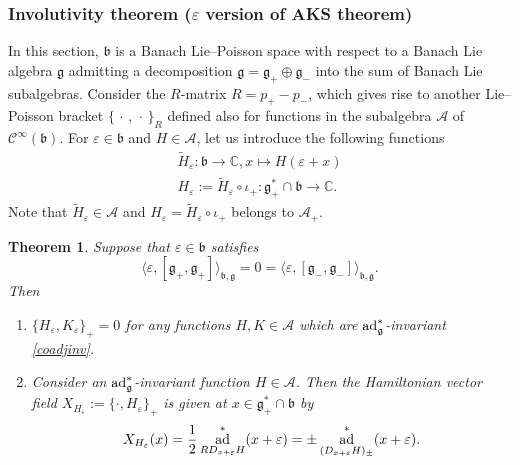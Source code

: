 \documentclass[a4paper,12pt,reqno]{amsart}%
\newtheorem{theorem}{Theorem}
\theoremstyle{definition}
\theoremstyle{remark}
\numberwithin{theorem}{section}
\numberwithin{equation}{section}
\newcommand{\1}{{\bf 1}}
\newcommand{\pb}{\{\,\cdot\,,\,\cdot\,\}}
\DeclareMathOperator{\ad}{\textnormal{ad}}
\newcommand{\Cp}{\mathscr{C}}
\newcommand{\g}{{\mathfrak g}}
\newcommand{\bg}{{\mathfrak b}}
\begin{document}
\subsubsection{Involutivity theorem ($\varepsilon$ version of AKS theorem)}\label{epsilonnon0}
In this section,  $\bg$ is a Banach Lie--Poisson space with respect to a Banach Lie algebra $\g$ admitting a decomposition $\g = \g_+\oplus \g_-$ into the sum of Banach Lie subalgebras. Consider  the $R$-matrix $R = p_+ - p_-$, which gives rise to another Lie--Poisson bracket $\pb_R$ defined also for functions in the subalgebra $\mathcal{A}$ of $\Cp^{\infty}(\bg)$.
For $\varepsilon\in\bg$ and $H\in\mathcal{A}$, let us introduce the following functions
\[
\begin{array}{l}
\tilde{H}_\varepsilon : \bg \rightarrow \mathbb{C}, x\mapsto H(\varepsilon+x)\\
H_\varepsilon:= \tilde{H}_\varepsilon\circ \iota_+: \g_+^*\cap\bg \rightarrow \mathbb{C}.
\end{array}
\]
Note that $\tilde{H}_\varepsilon\in\mathcal{A}$ and $H_\varepsilon = \tilde{H}_\varepsilon\circ \iota_+$ belongs to $\mathcal{A}_+$. 

\begin{theorem}\label{thmepsilonnon0}
    Suppose that $\varepsilon\in\bg$ satisfies
    \begin{equation}
\langle \varepsilon, [\g_+, \g_+]\rangle_{\bg, \g} = 0 = \langle \varepsilon, [\g_-, \g_-]\rangle_{\bg, \g}.
    \end{equation}
    Then 
    \begin{enumerate}
        \item $\{ H_\varepsilon, K_\varepsilon\}_+ = 0$ for any functions $H,K\in \mathcal{A}$ which are $\ad^*_\g$-invariant \eqref{coadjinv}.
        \item Consider an $\ad^*_\g$-invariant function $H\in\mathcal A$. Then the Hamiltonian vector field $X_{H_\varepsilon} := \{\cdot, H_\varepsilon\}_+$ is given at $x \in \g_+^*\cap\bg$ by
        \begin{equation}\label{XHepsilon}
X_{H_\varepsilon}(x) = \frac{1}{2}\ad^*_{R D_{x+ \varepsilon} H}(x+\varepsilon) = \pm \ad^*_{(D_{x+\varepsilon}H)_\pm}(x + \varepsilon).
        \end{equation}
    \end{enumerate}
\end{theorem}
\end{document}
